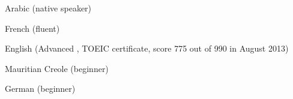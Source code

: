 \begin{cventries}
  \cventry
    {}
    {}
    {}
    {}
    {
      \begin{cvitems}
        \item {Arabic (native speaker)}
        \item {French  (fluent)}
        \item {English (Advanced , TOEIC certificate, score 775 out of 990 in August 2013)}
        \item {Mauritian Creole (beginner)}
        \item {German (beginner)}       
      \end{cvitems}
    }
\end{cventries}
